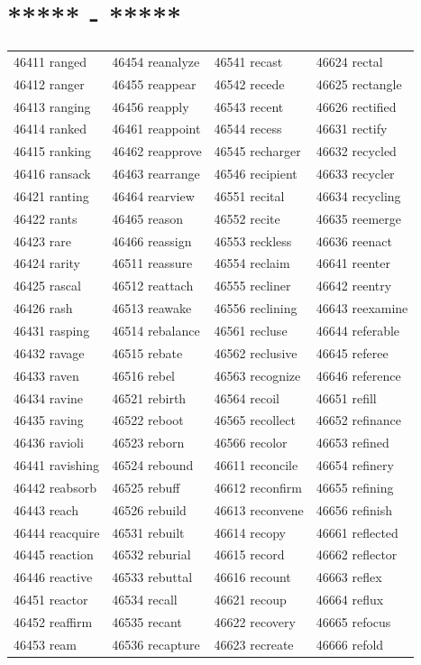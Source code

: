 \documentclass[10pt, oneside]{book}
\begin{document}
\begin{table}[h]
	\centering
	\section*{***** - *****}
	\begin{tabular}{l l l l}
46411 ranged &46454 reanalyze &46541 recast &46624 rectal\\
46412 ranger &46455 reappear &46542 recede &46625 rectangle\\
46413 ranging &46456 reapply &46543 recent &46626 rectified\\
46414 ranked &46461 reappoint &46544 recess &46631 rectify\\
46415 ranking &46462 reapprove &46545 recharger &46632 recycled\\
46416 ransack &46463 rearrange &46546 recipient &46633 recycler\\
46421 ranting &46464 rearview &46551 recital &46634 recycling\\
46422 rants &46465 reason &46552 recite &46635 reemerge\\
46423 rare &46466 reassign &46553 reckless &46636 reenact\\
46424 rarity &46511 reassure &46554 reclaim &46641 reenter\\
46425 rascal &46512 reattach &46555 recliner &46642 reentry\\
46426 rash &46513 reawake &46556 reclining &46643 reexamine\\
46431 rasping &46514 rebalance &46561 recluse &46644 referable\\
46432 ravage &46515 rebate &46562 reclusive &46645 referee\\
46433 raven &46516 rebel &46563 recognize &46646 reference\\
46434 ravine &46521 rebirth &46564 recoil &46651 refill\\
46435 raving &46522 reboot &46565 recollect &46652 refinance\\
46436 ravioli &46523 reborn &46566 recolor &46653 refined\\
46441 ravishing &46524 rebound &46611 reconcile &46654 refinery\\
46442 reabsorb &46525 rebuff &46612 reconfirm &46655 refining\\
46443 reach &46526 rebuild &46613 reconvene &46656 refinish\\
46444 reacquire &46531 rebuilt &46614 recopy &46661 reflected\\
46445 reaction &46532 reburial &46615 record &46662 reflector\\
46446 reactive &46533 rebuttal &46616 recount &46663 reflex\\
46451 reactor &46534 recall &46621 recoup &46664 reflux\\
46452 reaffirm &46535 recant &46622 recovery &46665 refocus\\
46453 ream &46536 recapture &46623 recreate &46666 refold\\
	\end{tabular}
 \end{table}
\end{document}
